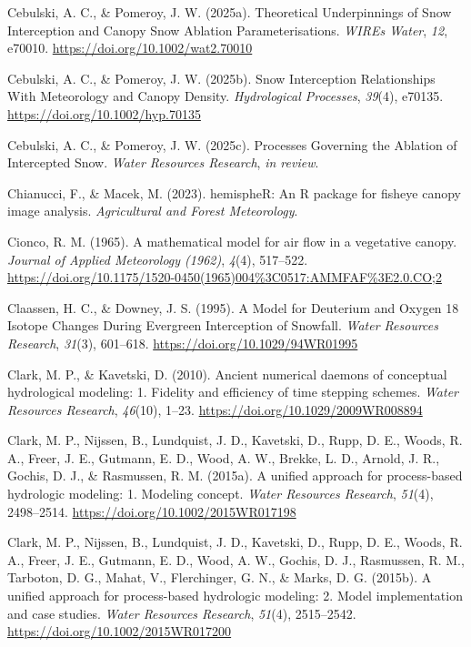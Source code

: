 \documentclass[
  letterpaper,
]{tex/uofsthesis-cs}
\newlength{\cslhangindent}
\newenvironment{CSLReferences}[2] %
 {\begin{list}{}{%
  \setlength{\itemindent}{0pt}
  \setlength{\leftmargin}{0pt}
  \setlength{\parsep}{0pt}
  \ifodd #1
   \setlength{\leftmargin}{\cslhangindent}
   \setlength{\itemindent}{-1\cslhangindent}
  \fi
  \setlength{\itemsep}{#2\baselineskip}}}
 {\end{list}}
\begin{document}
\begin{CSLReferences}{1}{0}
Cebulski, A. C., \& Pomeroy, J. W. (2025a). Theoretical {Underpinnings}
of {Snow Interception} and {Canopy Snow Ablation Parameterisations}.
\emph{WIREs Water}, \emph{12}, e70010.
\url{https://doi.org/10.1002/wat2.70010}

Cebulski, A. C., \& Pomeroy, J. W. (2025b). Snow {Interception
Relationships With Meteorology} and {Canopy Density}. \emph{Hydrological
Processes}, \emph{39}(4), e70135.
\url{https://doi.org/10.1002/hyp.70135}

Cebulski, A. C., \& Pomeroy, J. W. (2025c). Processes {Governing} the
{Ablation} of {Intercepted Snow}. \emph{Water Resources Research},
\emph{in review}.

Chianucci, F., \& Macek, M. (2023). {hemispheR}: An {R} package for
fisheye canopy image analysis. \emph{Agricultural and Forest
Meteorology}.

Cionco, R. M. (1965). A mathematical model for air flow in a vegetative
canopy. \emph{Journal of Applied Meteorology (1962)}, \emph{4}(4),
517--522.
\url{https://doi.org/10.1175/1520-0450(1965)004\%3C0517:AMMFAF\%3E2.0.CO;2}

Claassen, H. C., \& Downey, J. S. (1995). A {Model} for {Deuterium} and
{Oxygen} 18 {Isotope Changes During Evergreen Interception} of
{Snowfall}. \emph{Water Resources Research}, \emph{31}(3), 601--618.
\url{https://doi.org/10.1029/94WR01995}

Clark, M. P., \& Kavetski, D. (2010). Ancient numerical daemons of
conceptual hydrological modeling: 1. {Fidelity} and efficiency of time
stepping schemes. \emph{Water Resources Research}, \emph{46}(10), 1--23.
\url{https://doi.org/10.1029/2009WR008894}

Clark, M. P., Nijssen, B., Lundquist, J. D., Kavetski, D., Rupp, D. E.,
Woods, R. A., Freer, J. E., Gutmann, E. D., Wood, A. W., Brekke, L. D.,
Arnold, J. R., Gochis, D. J., \& Rasmussen, R. M. (2015a). A unified
approach for process-based hydrologic modeling: 1. {Modeling} concept.
\emph{Water Resources Research}, \emph{51}(4), 2498--2514.
\url{https://doi.org/10.1002/2015WR017198}

Clark, M. P., Nijssen, B., Lundquist, J. D., Kavetski, D., Rupp, D. E.,
Woods, R. A., Freer, J. E., Gutmann, E. D., Wood, A. W., Gochis, D. J.,
Rasmussen, R. M., Tarboton, D. G., Mahat, V., Flerchinger, G. N., \&
Marks, D. G. (2015b). A unified approach for process-based hydrologic
modeling: 2. {Model} implementation and case studies. \emph{Water
Resources Research}, \emph{51}(4), 2515--2542.
\url{https://doi.org/10.1002/2015WR017200}


\end{CSLReferences}
\end{document}
